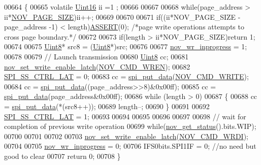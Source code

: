 \begin{DoxyCode}
00664 \{
00665     \textcolor{keyword}{volatile} \hyperlink{a00072_a59a9f6be4562c327cbfb4f7e8e18f08b}{Uint16} ii =1 ;
00666     
00667 
00668     \textcolor{keywordflow}{while}(page\_address > ii*\hyperlink{a00029_aad44ced0f63ecf5d2ced5bc0bf220287}{NOV\_PAGE\_SIZE})ii++;
00669 
00670     
00671     \textcolor{keywordflow}{if}((ii*NOV\_PAGE\_SIZE - page\_address -1) < length)\hyperlink{a00072_abb8ff8e213ac9f6fb21d2b968583b936}{ASSERT}(0);  \textcolor{comment}{/*page write operations attempts to
       cross page boundary.*/}
00672           
00673     \textcolor{keywordflow}{if}(length > ii*NOV\_PAGE\_SIZE)\textcolor{keywordflow}{return} 1;
00674 
00675     \hyperlink{a00072_af84840501dec18061d18a68c162a8fa2}{Uint8}* src8 = (\hyperlink{a00072_af84840501dec18061d18a68c162a8fa2}{Uint8}*)src;
00676 
00677     \hyperlink{a00060_a56fe014653ebdce270aeac664bf86e65}{nov\_wr\_inprogress} = 1;
00678 
00679     \textcolor{comment}{// Launch transmission}
00680     \hyperlink{a00072_af84840501dec18061d18a68c162a8fa2}{Uint8} cc;
00681     \hyperlink{a00060_a7b698f4b0088c4e28951c2204b7b821e}{nov\_set\_write\_enable\_latch}(\hyperlink{a00029_acc9f91a7c7d40a32755560dda080cf98}{NOV\_CMD\_WREN});
00682     \hyperlink{a00013_aa8b53e04161d178ebd9c01edf1584039}{SPI\_SS\_CTRL\_LAT} = 0;
00683     cc = \hyperlink{a00013_a19e2dff580e4d1b2198fa9108fca81ac}{spi\_put\_data}(\hyperlink{a00029_a031aab76ddb1258273541a65d70acbe1}{NOV\_CMD\_WRITE});
00684     cc = \hyperlink{a00013_a19e2dff580e4d1b2198fa9108fca81ac}{spi\_put\_data}((page\_address>>8)&0x00ff);
00685     cc = \hyperlink{a00013_a19e2dff580e4d1b2198fa9108fca81ac}{spi\_put\_data}(page\_address&0x00ff);
00686     \textcolor{keywordflow}{while} (length > 0)
00687     \{
00688            cc = \hyperlink{a00013_a19e2dff580e4d1b2198fa9108fca81ac}{spi\_put\_data}(*(src8++));  
00689            length--;
00690     \}
00691    
00692     \hyperlink{a00013_aa8b53e04161d178ebd9c01edf1584039}{SPI\_SS\_CTRL\_LAT} = 1;
00693 
00694 
00695 
00696 
00697 
00698     \textcolor{comment}{// wait for completion of previous write operation}
00699     \textcolor{keywordflow}{while}(\hyperlink{a00060_af9ccbc198ed63feb4fd6c18dd934590d}{nov\_get\_status}().bits.WIP);
00700     
00701 
00702 
00703     \hyperlink{a00060_a7b698f4b0088c4e28951c2204b7b821e}{nov\_set\_write\_enable\_latch}(\hyperlink{a00029_a3924df5fbf1e1ff642a9bde06e17b69d}{NOV\_CMD\_WRDI});
00704 
00705     \hyperlink{a00060_a56fe014653ebdce270aeac664bf86e65}{nov\_wr\_inprogress} = 0;
00706     IFS0bits.SPI1IF = 0;   \textcolor{comment}{//no need but good to clear}
00707     \textcolor{keywordflow}{return} 0;
00708 \}
\end{DoxyCode}


